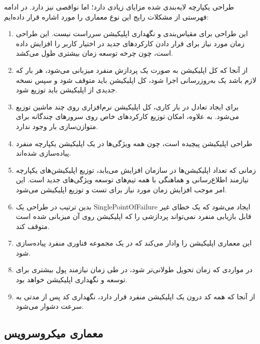 طراحی یکپارچه لایه‌بندی شده مزایای زیادی دارد؛ اما نواقصی نیز دارد. در ادامه فهرستی از مشکلات رایج این نوع معماری را مورد اشاره قرار داده‌ایم:
\begin{enumerate}

\item
این طراحی برای مقیاس‌بندی و نگهداری اپلیکیشن سرراست نیست. این طراحی زمان مورد نیاز برای قرار دادن کارکردهای جدید در اختیار کاربر را افزایش داده است، چون چرخه توسعه زمان بیشتری طول می‌کشد.

\item
از آنجا که کل اپلیکیشن به صورت یک پردازش منفرد میزبانی می‌شود، هر بار که لازم باشد یک به‌روزرسانی اجرا شود، کل اپلیکیشن باید متوقف شود و سپس نسخه جدیدی از اپلیکیشن باید توزیع شود.

\item
برای ایجاد تعادل در بار کاری، کل اپلیکیشن نرم‌افزاری روی چند ماشین توزیع می‌شود. به علاوه، امکان توزیع کارکردهای خاص روی سرورهای چندگانه برای متوازن‌سازی بار وجود ندارد.

\item
طراحی اپلیکیشن پیچیده است، چون همه ویژگی‌ها در یک اپلیکیشن یکپارچه منفرد پیاده‌سازی شده‌اند.

\item
زمانی که تعداد اپلیکیشن‌ها در سازمان افزایش می‌یابد، توزیع اپلیکیشن‌های یکپارچه نیازمند اطلاع‌رسانی و هماهنگی با همه تیم‌های توسعه ویژگی‌های جدید است. این امر موجب افزایش زمان مورد نیاز برای تست و توزیع اپلیکیشن می‌شود.

\item
بدین ترتیب در طراحی یک
\gls{SinglePointOfFailure}
ایجاد می‌شود که یک خطای غیر قابل بازیابی منفرد نمی‌تواند پردازشی را که اپلیکیشن روی آن میزبانی شده است متوقف کند.

\item
این معماری اپلیکیشن را وادار می‌کند که در یک مجموعه فناوری منفرد پیاده‌سازی شود.

\item
در مواردی که زمان تحویل طولانی‌تر شود، در طی زمان نیازمند پول بیشتری برای توسعه و نگهداری اپلیکیشن خواهد بود.

\item
از آنجا که همه کد درون یک اپلیکیشن منفرد قرار دارد، نگهداری کد پس از مدتی به سرعت دشوار می‌شود.

\end{enumerate}

\subsection{معماری میکروسرویس}

